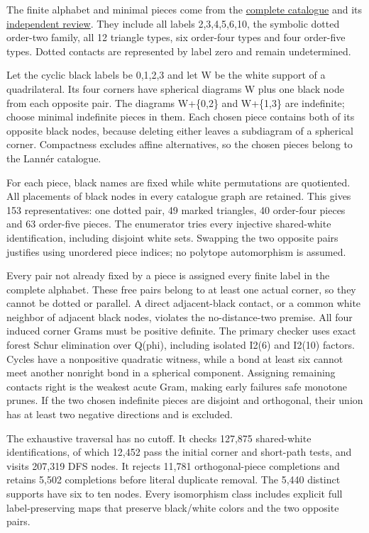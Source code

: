 \documentclass[
  10pt,
]{report}
\begin{document}
The finite alphabet and minimal pieces come from the
\href{fresh_sqrt5_lanner_catalogue_20261015.md}{complete catalogue} and
its \href{fresh_sqrt5_lanner_catalogue_20261015_review.md}{independent
review}. They include all labels 2,3,4,5,6,10, the symbolic dotted
order-two family, all 12 triangle types, six order-four types and four
order-five types. Dotted contacts are represented by label zero and
remain undetermined.

Let the cyclic black labels be 0,1,2,3 and let W be the white support of
a quadrilateral. Its four corners have spherical diagrams W plus one
black node from each opposite pair. The diagrams W+\{0,2\} and W+\{1,3\}
are indefinite; choose minimal indefinite pieces in them. Each chosen
piece contains both of its opposite black nodes, because deleting either
leaves a subdiagram of a spherical corner. Compactness excludes affine
alternatives, so the chosen pieces belong to the Lannér catalogue.

For each piece, black names are fixed while white permutations are
quotiented. All placements of black nodes in every catalogue graph are
retained. This gives 153 representatives: one dotted pair, 49 marked
triangles, 40 order-four pieces and 63 order-five pieces. The enumerator
tries every injective shared-white identification, including disjoint
white sets. Swapping the two opposite pairs justifies using unordered
piece indices; no polytope automorphism is assumed.

Every pair not already fixed by a piece is assigned every finite label
in the complete alphabet. These free pairs belong to at least one actual
corner, so they cannot be dotted or parallel. A direct adjacent-black
contact, or a common white neighbor of adjacent black nodes, violates
the no-distance-two premise. All four induced corner Grams must be
positive definite. The primary checker uses exact forest Schur
elimination over Q(phi), including isolated I2(6) and I2(10) factors.
Cycles have a nonpositive quadratic witness, while a bond at least six
cannot meet another nonright bond in a spherical component. Assigning
remaining contacts right is the weakest acute Gram, making early
failures safe monotone prunes. If the two chosen indefinite pieces are
disjoint and orthogonal, their union has at least two negative
directions and is excluded.

The exhaustive traversal has no cutoff. It checks 127,875 shared-white
identifications, of which 12,452 pass the initial corner and short-path
tests, and visits 207,319 DFS nodes. It rejects 11,781 orthogonal-piece
completions and retains 5,502 completions before literal duplicate
removal. The 5,440 distinct supports have six to ten nodes. Every
isomorphism class includes explicit full label-preserving maps that
preserve black/white colors and the two opposite pairs.
\end{document}
